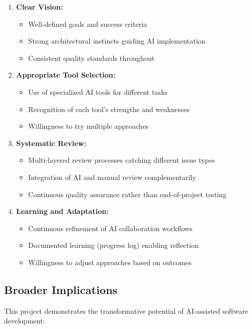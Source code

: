 \documentclass[12pt,a4paper]{article}
\begin{document}
\begin{enumerate}
    \item \textbf{Clear Vision:}
    \begin{itemize}
        \item Well-defined goals and success criteria
        \item Strong architectural instincts guiding AI implementation
        \item Consistent quality standards throughout
    \end{itemize}
    
    \item \textbf{Appropriate Tool Selection:}
    \begin{itemize}
        \item Use of specialized AI tools for different tasks
        \item Recognition of each tool's strengths and weaknesses
        \item Willingness to try multiple approaches
    \end{itemize}
    
    \item \textbf{Systematic Review:}
    \begin{itemize}
        \item Multi-layered review processes catching different issue types
        \item Integration of AI and manual review complementarily
        \item Continuous quality assurance rather than end-of-project testing
    \end{itemize}
    
    \item \textbf{Learning and Adaptation:}
    \begin{itemize}
        \item Continuous refinement of AI collaboration workflows
        \item Documented learning (progress log) enabling reflection
        \item Willingness to adjust approaches based on outcomes
    \end{itemize}
\end{enumerate}

\subsection{Broader Implications}

This project demonstrates the transformative potential of AI-assisted software development:
\end{document}
